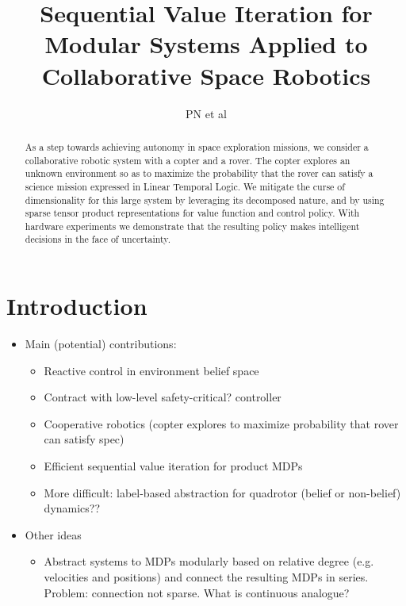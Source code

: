 \documentclass[conference]{IEEEtran}
\begin{document}
\title{\huge Sequential Value Iteration for Modular Systems Applied to Collaborative Space Robotics}

\author{PN et al}

\maketitle

\begin{abstract}
  As a step towards achieving autonomy in space exploration missions, we consider a collaborative robotic system with a copter and a rover. The copter explores an unknown environment so as to maximize the probability that the rover can satisfy a science mission expressed in Linear Temporal Logic. We mitigate the curse of dimensionality for this large system by leveraging its decomposed nature, and by using sparse tensor product representations for value function and control policy. With hardware experiments we demonstrate that the resulting policy makes intelligent decisions in the face of uncertainty.
\end{abstract}

\IEEEpeerreviewmaketitle

	

\section{Introduction}

\begin{itemize}
  \item Main (potential) contributions:
  \begin{itemize}
    \item Reactive control in environment belief space
    \item Contract with low-level safety-critical? controller
    \item Cooperative robotics (copter explores to maximize probability that rover can satisfy spec)
    \item Efficient sequential value iteration for product MDPs
    \item More difficult: label-based abstraction for quadrotor (belief or non-belief) dynamics?? 
  \end{itemize}
  \item Other ideas
  \begin{itemize}
  	\item Abstract systems to MDPs modularly based on relative degree (e.g. velocities and positions) and connect the resulting MDPs in series. Problem: connection not sparse. What is continuous analogue?
  \end{itemize}
\end{itemize}
\end{document}
